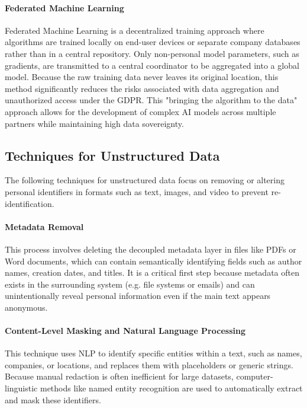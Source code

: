 \paragraph{Federated Machine Learning}
Federated Machine Learning is a decentralized training approach where algorithms are trained locally on end-user devices or separate company databases rather than in a central repository. Only non-personal model parameters, such as gradients, are transmitted to a central coordinator to be aggregated into a global model. Because the raw training data never leaves its original location, this method significantly reduces the risks associated with data aggregation and unauthorized access under the GDPR. This "bringing the algorithm to the data" approach allows for the development of complex AI models across multiple partners while maintaining high data sovereignty.
\autocite[101--103]{Krebs2022}
\autocite[7, 52--53]{schwartmann2022praxisleitfaden}

\subsection{Techniques for Unstructured Data}

The following techniques for unstructured data focus on removing or altering personal identifiers in formats such as text, images, and video to prevent re-identification.

\paragraph{Metadata Removal}
This process involves deleting the decoupled metadata layer in files like PDFs or Word documents, which can contain semantically identifying fields such as author names, creation dates, and titles. It is a critical first step because metadata often exists in the surrounding system (e.g. file systems or emails) and can unintentionally reveal personal information even if the main text appears anonymous.
\autocite[107--110]{Krebs2022}

\paragraph{Content-Level Masking and Natural Language Processing}
This technique uses \ac{NLP} to identify specific entities within a text, such as names, companies, or locations, and replaces them with placeholders or generic strings. Because manual redaction is often inefficient for large datasets, computer-linguistic methods like named entity recognition are used to automatically extract and mask these identifiers.
\autocite[107--110]{Krebs2022}

